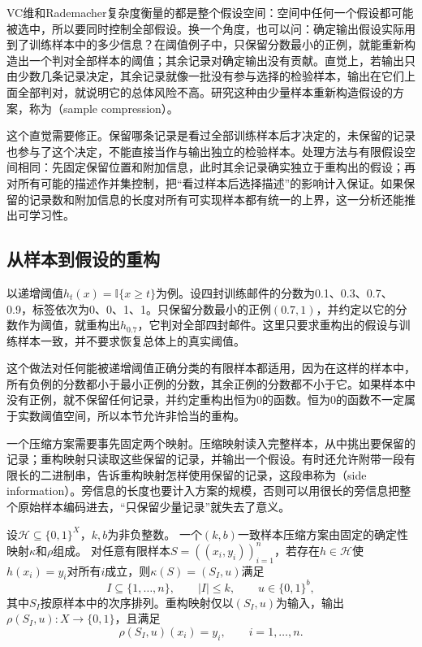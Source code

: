 VC维和Rademacher复杂度衡量的都是整个假设空间：空间中任何一个假设都可能被选中，所以要同时控制全部假设。换一个角度，也可以问：确定输出假设实际用到了训练样本中的多少信息？在阈值例子中，只保留分数最小的正例，就能重新构造出一个判对全部样本的阈值；其余记录对确定输出没有贡献。直觉上，若输出只由少数几条记录决定，其余记录就像一批没有参与选择的检验样本，输出在它们上面全部判对，就说明它的总体风险不高。研究这种由少量样本重新构造假设的方案，称为（sample compression）。

这个直觉需要修正。保留哪条记录是看过全部训练样本后才决定的，未保留的记录也参与了这个决定，不能直接当作与输出独立的检验样本。处理方法与有限假设空间相同：先固定保留位置和附加信息，此时其余记录确实独立于重构出的假设；再对所有可能的描述作并集控制，把“看过样本后选择描述”的影响计入保证。如果保留的记录数和附加信息的长度对所有可实现样本都有统一的上界，这一分析还能推出可学习性。

\subsection{从样本到假设的重构}

以递增阈值$h_t(x)=\mathbb I\{x\geq t\}$为例。设四封训练邮件的分数为0.1、0.3、0.7、0.9，标签依次为0、0、1、1。只保留分数最小的正例$(0.7,1)$，并约定以它的分数作为阈值，就重构出$h_{0.7}$，它判对全部四封邮件。这里只要求重构出的假设与训练样本一致，并不要求恢复总体上的真实阈值。

这个做法对任何能被递增阈值正确分类的有限样本都适用，因为在这样的样本中，所有负例的分数都小于最小正例的分数，其余正例的分数都不小于它。如果样本中没有正例，就不保留任何记录，并约定重构出恒为0的函数。恒为0的函数不一定属于实数阈值空间，所以本节允许非恰当的重构。

一个压缩方案需要事先固定两个映射。压缩映射读入完整样本，从中挑出要保留的记录；重构映射只读取这些保留的记录，并输出一个假设。有时还允许附带一段有限长的二进制串，告诉重构映射怎样使用保留的记录，这段串称为（side information）。旁信息的长度也要计入方案的规模，否则可以用很长的旁信息把整个原始样本编码进去，“只保留少量记录”就失去了意义。

\begin{definition}[一致样本压缩方案]
\label{def:sample-compression}
设$\mathcal H\subseteq\{0,1\}^X$，$k,b$为非负整数。
一个$(k,b)$一致样本压缩方案由固定的确定性映射$\kappa$和$\rho$组成。
对任意有限样本$S=((x_i,y_i))_{i=1}^n$，若存在$h\in\mathcal H$使
$h(x_i)=y_i$对所有$i$成立，则$\kappa(S)=(S_I,u)$满足
\[
 I\subseteq\{1,\ldots,n\},\qquad |I|\leq k,\qquad u\in\{0,1\}^b,
\]
其中$S_I$按原样本中的次序排列。重构映射仅以$(S_I,u)$为输入，输出
$\rho(S_I,u):X\to\{0,1\}$，且满足
\[
 \rho(S_I,u)(x_i)=y_i,\qquad i=1,\ldots,n.
\]
\end{definition}

